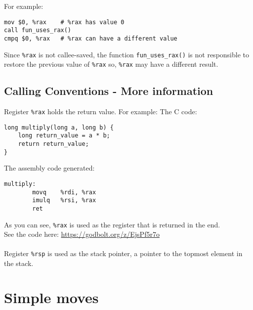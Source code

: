 \documentclass{article}
\begin{document}
\noindent For example:
\begin{verbatim}
mov $0, %rax    # %rax has value 0
call fun_uses_rax()
cmpq $0, %rax   # %rax can have a different value 
\end{verbatim}

Since \texttt{\%rax} is not callee-saved, the function \texttt{fun\_uses\_rax()} is not responsible to restore the previous value of \texttt{\%rax} so, \texttt{\%rax} may have a different result.

\subsection{Calling Conventions - More information}
Register \texttt{\%rax} holds the return value.
\noindent For example:
\noindent The C code:
\begin{verbatim}
long multiply(long a, long b) {
    long return_value = a * b;
    return return_value;
}
\end{verbatim}
\noindent The assembly code generated:
\begin{verbatim}
multiply:
        movq    %rdi, %rax
        imulq   %rsi, %rax
        ret
\end{verbatim}

As you can see, \texttt{\%rax} is used as the register that is returned in the end. \\

See the code here: \url{https://godbolt.org/z/EjsPf5r7o} \\
\\

Register \texttt{\%rsp} is used as the stack pointer, a pointer to the topmost element in the stack.
\clearpage
\section{Simple moves}
\end{document}
